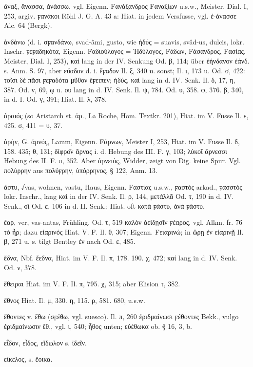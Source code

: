 ἄναξ, ἄνασσα, ἀνάσσω, vgl. Eigenn. Fανάξανδρος Fαναξίων u.s.w.,  Meister,
Dial. I, 253, argiv. ϝανάκοι Röhl J. G. A. 43 a: Hiat. in jedem Versfusse, vgl.
ἐ-άνασσε Alc. 64 (Bergk).

ἁνδάνω (d. i. σϝανδάνω,  svad-âmi, gusto, wie ἡδύς = suavis,  svâd-us,
dulcis, lokr. Inschr. ϝεϝαδηκότα,  Eigenn. Fαδιούλογος = Ἡδύλογος, Fάδων,
Fάσανδρος, Fασίας, Meister, Dial. I, 253), καί lang in der IV. Senkung Od. β,
114; über ἑήνδανον ἑάνδ. s. Anm. S. 97, aber εὔαδον d. i. ἔϝαδον Il. ξ, 340 u.
sonst; Il. ι, 173 u. Od. σ, 422: τοῖσι δὲ πᾶσι ϝεϝαδότα μῦθον ἔϝειπεν; ἡδύς, καί
lang in d. IV. Senk. Il. δ, 17, η, 387. Od. ν, 69, ῳ u. ου lang in d. IV. Senk.
Il. ψ, 784. Od. υ, 358. φ, 376. β, 340, in d. I. Od. γ, 391; Hiat. Il. λ, 378.

ἁραιός (so Aristarch st. ἀρ., La Roche, Hom. Textkr. 201), Hiat. im V. Fusse Il.
ε, 425. σ, 411 = υ, 37. 

ἀρήν, G. ἀρνός, Lamm,  Eigenn. Fάρνων, Meister I, 253, Hiat. im V. Fusse
Il. δ, 158. 435; θ, 131; δίφρο̄ν ἄρνας i. d. Hebung des III. F. γ, 103; λύκοῖ
ἄρνεσσι Hebung des II. F. π, 352. Aber ἀρνειός, Widder, zeigt von Dig. keine
Spur. Vgl. πολύρρην aus πολύϝρην, ὑπόρρηνος, § 122, Anm. 13.

ἄστυ,  √vas, wohnen, vastu, Haus,  Eigenn. Fαστίας u.s.w.,
ϝαστός arkad., ϝασστός lokr. Inschr., lang καί in der IV. Senk. Il. ρ, 144,
μετάλλᾶ Od. τ, 190 in d. IV. Senk., οἵ Od. ε, 106 in d. II. Senk.; Hiat. oft
κατὰ ϝάστυ, ἀνὰ ϝάστυ. 

ἔαρ, ver,  vas-antas, Frühling, Od. τ, 519 καλὸν ἀείδῃσῖν ϝέαρος, vgl. Alkm.
fr. 76 τὸ ἦρ; dazu εἰαρινός Hiat. V. F. Il. θ, 307;  Eigenn. Fειαρινώ; in
ὥρῃ ἐν εἰαρινῇ Il. β, 271 u. s. tilgt Bentley ἐν nach Od. ε, 485. 

ἕδνα, Nbf. ἔεδνα, Hiat. im V. F. Il. π, 178. 190. χ, 472; καί lang in d. IV.
Senk. Od. ν, 378. 

ἔθειραι Hiat. im V. F. Il. π, 795. χ, 315; aber Elision τ, 382.

ἔθνος Hiat. Il. μ, 330. η, 115. ρ, 581. 680, u.s.w.

ἔθοντες v. ἔθω (σϝέθω, vgl. suesco). Il. π, 260 ἐριδμαίνωσι ϝέθοντες Bekk., vulgo ἐριδμαίνωσιν ἔθ., vgl. ι, 540; ἦθος unten; εὐέθωκα ob. § 16, 3, b.

εἶδον, εἶδος, εἴδωλον s. ἰδεῖν.

εἴκελος, s. ἔοικα.

